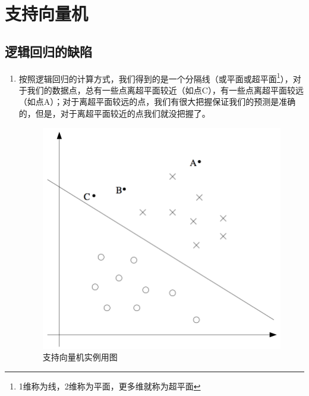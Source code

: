 \section{支持向量机}

\subsection{逻辑回归的缺陷}
\begin{enumerate}
	\item 按照逻辑回归的计算方式，我们得到的是一个分隔线（或平面或超平面\footnote{1维称为线，2维称为平面，更多维就称为超平面}），对于我们的数据点，总有一些点离超平面较近（如点C），有一些点离超平面较远（如点A）；对于离超平面较远的点，我们有很大把握保证我们的预测是准确的，但是，对于离超平面较近的点我们就没把握了。
	\begin{figure}[htbp]
		\centering
		\includegraphics[scale=0.5]{images/逻辑回归缺陷讲述}
		\caption{支持向量机实例用图}
	\end{figure}
\end{enumerate}

